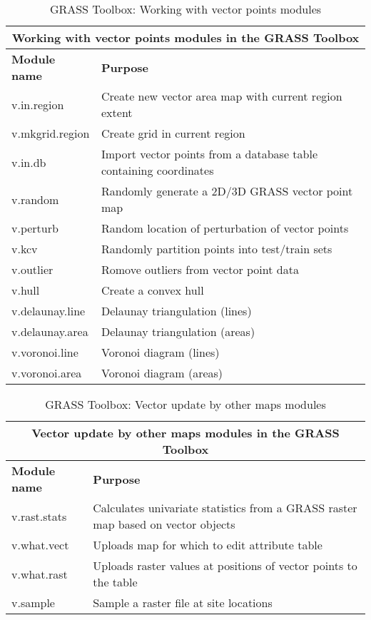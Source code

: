 \begin{table}[H]
\centering
 \begin{tabular}{|p{4cm}|p{10cm}|}
  \hline \multicolumn{2}{|c|}{\textbf{Working with vector points modules in the GRASS Toolbox}} \\
  \hline \textbf{Module name} & \textbf{Purpose} \\
  \hline v.in.region & Create new vector area map with current region extent \\
  \hline v.mkgrid.region & Create grid in current region \\
  \hline v.in.db & Import vector points from a database table containing
  coordinates \\
  \hline v.random & Randomly generate a 2D/3D GRASS vector point map \\
  \hline v.perturb & Random location of perturbation of vector points \\ 
  \hline v.kcv & Randomly partition points into test/train sets \\
  \hline v.outlier & Romove outliers from vector point data \\
  \hline v.hull & Create a convex hull \\
  \hline v.delaunay.line & Delaunay triangulation (lines) \\
  \hline v.delaunay.area & Delaunay triangulation (areas) \\
  \hline v.voronoi.line & Voronoi diagram (lines) \\
  \hline v.voronoi.area & Voronoi diagram (areas) \\
\hline
\end{tabular}
\caption{GRASS Toolbox: Working with vector points modules}
\end{table}

\begin{table}[H]
\centering
 \begin{tabular}{|p{4cm}|p{10cm}|}
  \hline \multicolumn{2}{|c|}{\textbf{Vector update by other maps modules in the GRASS
  Toolbox}} \\
  \hline \textbf{Module name} & \textbf{Purpose} \\
  \hline v.rast.stats & Calculates univariate statistics from a GRASS raster
  map based on vector objects\\
  \hline v.what.vect & Uploads map for which to edit attribute table \\
  \hline v.what.rast & Uploads raster values at positions of vector points to
  the table \\
  \hline v.sample & Sample a raster file at site locations \\
\hline
\end{tabular}
\caption{GRASS Toolbox: Vector update by other maps modules}
\end{table}

